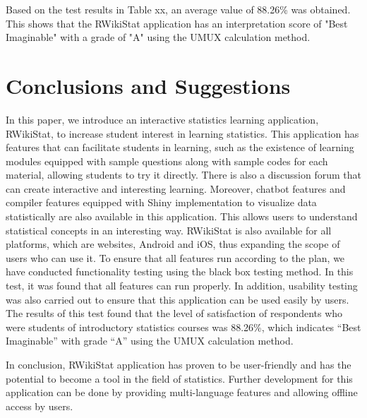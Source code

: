 \documentclass[conference,a4paper]{IEEEtran}
\begin{document}
Based on the test results in Table xx, an average value of 88.26\% was obtained. This shows that the RWikiStat application has an interpretation score of "Best Imaginable" with a grade of "A" using the UMUX calculation method.



\section{Conclusions and Suggestions}
\label{sect:conclusion}

In this paper, we introduce an interactive statistics learning application, RWikiStat, to increase student interest in learning statistics. This application has features that can facilitate students in learning, such as the existence of learning modules equipped with sample questions along with sample codes for each material, allowing students to try it directly. There is also a discussion forum that can create interactive and interesting learning. Moreover, chatbot features and compiler features equipped with Shiny implementation to visualize data statistically are also available in this application. This allows users to understand statistical concepts in an interesting way. RWikiStat is also available for all platforms, which are websites, Android and iOS, thus expanding the scope of users who can use it. To ensure that all features run according to the plan, we have conducted functionality testing using the black box testing method. In this test, it was found that all features can run properly. In addition, usability testing was also carried out to ensure that this application can be used easily by users. The results of this test found that the level of satisfaction of respondents who were students of introductory statistics courses was 88.26\%, which indicates “Best Imaginable” with grade “A” using the UMUX calculation method.

In conclusion, RWikiStat application has proven to be user-friendly and has the potential to become a tool in the field of statistics. Further development for this application can be done by providing multi-language features and allowing offline access by users.


\balance
\end{document}
